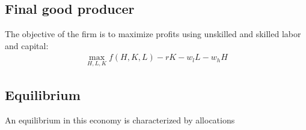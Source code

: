 \documentclass[11pt]{article}
\begin{document}
\subsection{Final good producer}
The objective of the firm is to maximize profits using unskilled  and skilled labor and capital:
\begin{align}
	\max_{H,L,K}f(H,K,L)-rK-w_lL-w_hH
\end{align}

\subsection{Equilibrium}
An equilibrium in this economy is characterized by allocations {}


\newpage



\end{document}
